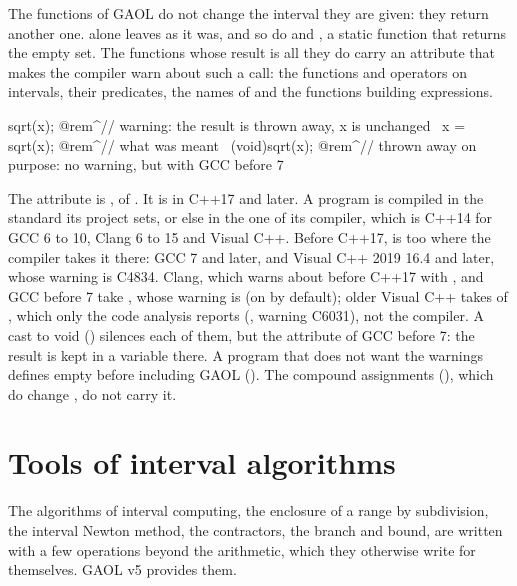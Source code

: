 \documentclass[12pt,a4paper,twoside,openright]{book}
\begin{document}
The functions of GAOL do not change the interval they are given: they return
another one.  alone leaves  as it was, and so do
 and , a static function that returns the
empty set. The functions whose result is all they do carry an attribute that
makes the compiler warn about such a call:\newinvfive{} the functions and
operators on intervals, their predicates, the names of 
and the functions building expressions.

\begin{example}
sqrt(x);        @rem^// warning: the result is thrown away, x is unchanged~
x = sqrt(x);    @rem^// what was meant~
(void)sqrt(x);  @rem^// thrown away on purpose: no warning, but with GCC before 7~
\end{example}

\noindent
The attribute is , of . It is
\code{[[nodiscard]]} in C++17 and later. A program is compiled in the standard
its project sets, or else in the one of its compiler, which is C++14 for GCC 6
to 10, Clang 6 to 15 and Visual C++. Before C++17,  is
\code{[[nodiscard]]} too where the compiler takes it there: GCC 7 and later,
and Visual C++ 2019 16.4 and later, whose warning is C4834. Clang, which warns
about \code{[[nodiscard]]} before C++17 with , and GCC
before 7 take , whose warning
is  (on by default); older Visual C++ takes
 of , which only the code analysis
reports (, warning C6031), not the compiler. A cast to void
() silences each of them, but the attribute of GCC
before 7: the result is kept in a variable there. A program that does not
want the warnings defines  empty before including GAOL
(). The compound assignments (), which
do change , do not carry it.

\section{Tools of interval algorithms}\label{sec:tools}
%
%
%

The algorithms of interval computing, the enclosure of a range by
subdivision, the interval Newton method, the contractors, the branch and
bound, are written with a few operations beyond the arithmetic, which they
otherwise write for themselves. GAOL v5 provides them.\newinvfive
\end{document}
